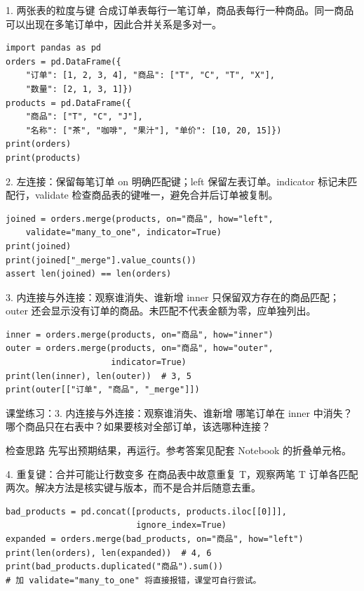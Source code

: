 \begin{frame}[fragile]{1. 两张表的粒度与键}
\small 合成订单表每行一笔订单，商品表每行一种商品。同一商品可以出现在多笔订单中，因此合并关系是多对一。
\medskip
\begin{lstlisting}
import pandas as pd
orders = pd.DataFrame({
    "订单": [1, 2, 3, 4], "商品": ["T", "C", "T", "X"],
    "数量": [2, 1, 3, 1]})
products = pd.DataFrame({
    "商品": ["T", "C", "J"],
    "名称": ["茶", "咖啡", "果汁"], "单价": [10, 20, 15]})
print(orders)
print(products)
\end{lstlisting}
\end{frame}

\begin{frame}[fragile]{2. 左连接：保留每笔订单}
\small on 明确匹配键；left 保留左表订单。indicator 标记未匹配行，validate 检查商品表的键唯一，避免合并后订单被复制。
\medskip
\begin{lstlisting}
joined = orders.merge(products, on="商品", how="left",
    validate="many_to_one", indicator=True)
print(joined)
print(joined["_merge"].value_counts())
assert len(joined) == len(orders)
\end{lstlisting}
\end{frame}

\begin{frame}[fragile]{3. 内连接与外连接：观察谁消失、谁新增}
\small inner 只保留双方存在的商品匹配；outer 还会显示没有订单的商品。未匹配不代表金额为零，应单独列出。
\medskip
\begin{lstlisting}
inner = orders.merge(products, on="商品", how="inner")
outer = orders.merge(products, on="商品", how="outer",
                     indicator=True)
print(len(inner), len(outer))  # 3, 5
print(outer[["订单", "商品", "_merge"]])
\end{lstlisting}
\end{frame}
\begin{frame}[fragile]{课堂练习：3. 内连接与外连接：观察谁消失、谁新增}
哪笔订单在 inner 中消失？哪个商品只在右表中？如果要核对全部订单，该选哪种连接？
\medskip
\begin{block}{检查思路}
先写出预期结果，再运行。参考答案见配套 Notebook 的折叠单元格。
\end{block}
\end{frame}

\begin{frame}[fragile]{4. 重复键：合并可能让行数变多}
\small 在商品表中故意重复 T，观察两笔 T 订单各匹配两次。解决方法是核实键与版本，而不是合并后随意去重。
\medskip
\begin{lstlisting}
bad_products = pd.concat([products, products.iloc[[0]]],
                          ignore_index=True)
expanded = orders.merge(bad_products, on="商品", how="left")
print(len(orders), len(expanded))  # 4, 6
print(bad_products.duplicated("商品").sum())
# 加 validate="many_to_one" 将直接报错，课堂可自行尝试。
\end{lstlisting}
\end{frame}

